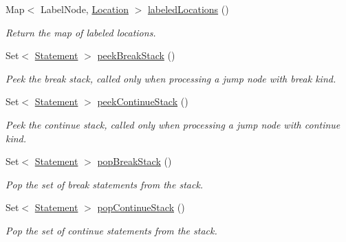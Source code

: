 \begin{DoxyCompactItemize}
Map$<$ Label\+Node, \hyperlink{interfaceedu_1_1udel_1_1cis_1_1vsl_1_1civl_1_1model_1_1IF_1_1location_1_1Location}{Location} $>$ \hyperlink{classedu_1_1udel_1_1cis_1_1vsl_1_1civl_1_1model_1_1common_1_1FunctionInfo_ac27c534bf0acc3d4caffd0eeb0263b36}{labeled\+Locations} ()
\begin{DoxyCompactList}\small\item\em Return the map of labeled locations. \end{DoxyCompactList}\item 
Set$<$ \hyperlink{interfaceedu_1_1udel_1_1cis_1_1vsl_1_1civl_1_1model_1_1IF_1_1statement_1_1Statement}{Statement} $>$ \hyperlink{classedu_1_1udel_1_1cis_1_1vsl_1_1civl_1_1model_1_1common_1_1FunctionInfo_ac6de12b871a2f970a5b45d8dd4c1fa7d}{peek\+Break\+Stack} ()
\begin{DoxyCompactList}\small\item\em Peek the break stack, called only when processing a jump node with break kind. \end{DoxyCompactList}\item 
Set$<$ \hyperlink{interfaceedu_1_1udel_1_1cis_1_1vsl_1_1civl_1_1model_1_1IF_1_1statement_1_1Statement}{Statement} $>$ \hyperlink{classedu_1_1udel_1_1cis_1_1vsl_1_1civl_1_1model_1_1common_1_1FunctionInfo_a3ac22a99cc7c8eae9ec696b7858c3201}{peek\+Continue\+Stack} ()
\begin{DoxyCompactList}\small\item\em Peek the continue stack, called only when processing a jump node with continue kind. \end{DoxyCompactList}\item 
Set$<$ \hyperlink{interfaceedu_1_1udel_1_1cis_1_1vsl_1_1civl_1_1model_1_1IF_1_1statement_1_1Statement}{Statement} $>$ \hyperlink{classedu_1_1udel_1_1cis_1_1vsl_1_1civl_1_1model_1_1common_1_1FunctionInfo_a1a8fe1914429a2f3076506d1271ecb40}{pop\+Break\+Stack} ()
\begin{DoxyCompactList}\small\item\em Pop the set of break statements from the stack. \end{DoxyCompactList}\item 
Set$<$ \hyperlink{interfaceedu_1_1udel_1_1cis_1_1vsl_1_1civl_1_1model_1_1IF_1_1statement_1_1Statement}{Statement} $>$ \hyperlink{classedu_1_1udel_1_1cis_1_1vsl_1_1civl_1_1model_1_1common_1_1FunctionInfo_af4c184e55a5be2553fdb5d68c2512cfd}{pop\+Continue\+Stack} ()
\begin{DoxyCompactList}\small\item\em Pop the set of continue statements from the stack. \end{DoxyCompactList}\item 

\end{DoxyCompactItemize}
